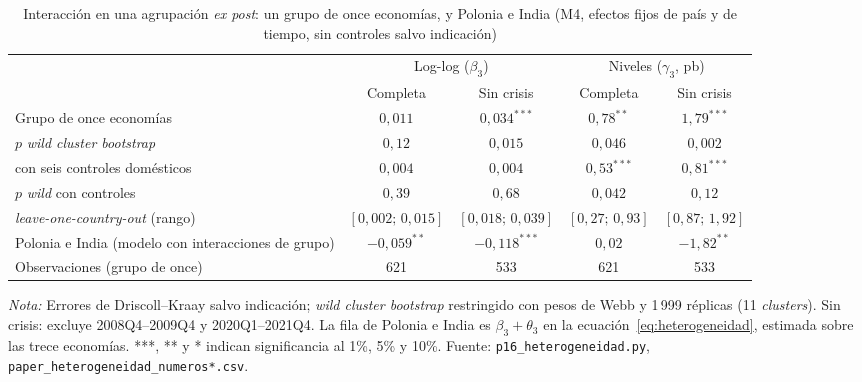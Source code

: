\begin{table}[htbp]
\centering
\small
\caption[Heterogeneidad por tipo de economía: agrupación \textit{ex post}]{Interacción en una agrupación \textit{ex post}: un grupo de once economías, y Polonia e India (M4, efectos fijos de país y de tiempo, sin controles salvo indicación)}
\label{tab:heterogeneidad}
\begin{adjustbox}{max width=\linewidth}
\begin{tabular}{l cc cc}
\toprule
 & \multicolumn{2}{c}{Log-log ($\beta_3$)} & \multicolumn{2}{c}{Niveles ($\gamma_3$, pb)} \\
\cmidrule(lr){2-3}\cmidrule(lr){4-5}
 & Completa & Sin crisis & Completa & Sin crisis \\
\midrule
Grupo de once economías & $0{,}011$ & $0{,}034^{***}$ & $0{,}78^{**}$ & $1{,}79^{***}$ \\
\quad $p$ \textit{wild cluster bootstrap} & $0{,}12$ & $0{,}015$ & $0{,}046$ & $0{,}002$ \\
\quad con seis controles domésticos & $0{,}004$ & $0{,}004$ & $0{,}53^{***}$ & $0{,}81^{***}$ \\
\quad $p$ \textit{wild} con controles & $0{,}39$ & $0{,}68$ & $0{,}042$ & $0{,}12$ \\
\quad \textit{leave-one-country-out} (rango) & $[0{,}002;\,0{,}015]$ & $[0{,}018;\,0{,}039]$ & $[0{,}27;\,0{,}93]$ & $[0{,}87;\,1{,}92]$ \\
\addlinespace
Polonia e India (modelo con interacciones de grupo) & $-0{,}059^{**}$ & $-0{,}118^{***}$ & $0{,}02$ & $-1{,}82^{**}$ \\
\addlinespace
Observaciones (grupo de once) & 621 & 533 & 621 & 533 \\
\bottomrule
\end{tabular}
\end{adjustbox}
\par\smallskip\parbox{0.95\linewidth}{\footnotesize \textit{Nota:} Errores de Driscoll--Kraay salvo indicación; \textit{wild cluster bootstrap} restringido con pesos de Webb y 1\,999 réplicas (11 \textit{clusters}). Sin crisis: excluye 2008Q4--2009Q4 y 2020Q1--2021Q4. La fila de Polonia e India es $\beta_3+\theta_3$ en la ecuación~\eqref{eq:heterogeneidad}, estimada sobre las trece economías. ***, ** y * indican significancia al 1\%, 5\% y 10\%. Fuente: \texttt{p16\_heterogeneidad.py}, \texttt{paper\_heterogeneidad\_numeros*.csv}.}
\end{table}

